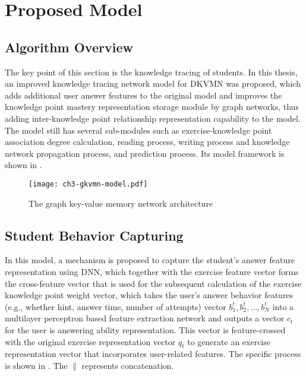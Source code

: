 \section{Proposed Model}

\subsection{Algorithm Overview}

The key point of this section is the knowledge tracing of students. In this thesis, an improved knowledge tracing network model for DKVMN was proposed, which adds additional user answer features to the original model and improves the knowledge point mastery representation storage module by graph networks, thus adding inter-knowledge point relationship representation capability to the model. The model still has several sub-modules such as exercise-knowledge point association degree calculation, reading process, writing process and knowledge network propagation process, and prediction process. Its model framework is shown in \figname{\ref{fig:ch3-gkvmn-model}}.

\begin{figure}[htbp!]
    \centering
    \texttt{[image: ch3-gkvmn-model.pdf]}
    \caption{The graph key-value memory network architecture}\label{fig:ch3-gkvmn-model}
\end{figure}

\subsection{Student Behavior Capturing}

In this model, a mechanism is proposed to capture the student's answer feature representation using DNN, which together with the exercise feature vector forms the cross-feature vector that is used for the subsequent calculation of the exercise knowledge point weight vector, which takes the user's answer behavior features (e.g., whether hint, answer time, number of attempts) vector \(b_1^t,b_2^t,\ldots,b_N^t\) into a multilayer perceptron based feature extraction network and outputs a vector \(c_t\) for the user is answering ability representation. This vector is feature-crossed with the original exercise representation vector \(q_t\) to generate an exercise representation vector that incorporates user-related features. The specific process is shown in \eqname{\ref{fml:ch3-sbcap}}. The \(\| \) represents concatenation.

